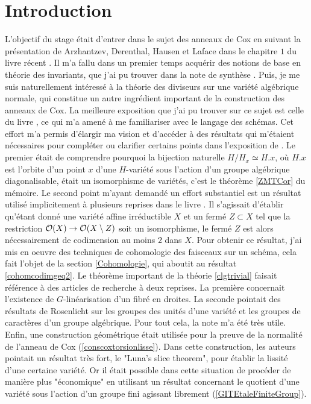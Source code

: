
\section*{Introduction}

L'objectif du stage était d'entrer dans le sujet des anneaux de Cox en suivant la présentation de Arzhantzev, Derenthal, Hausen et Laface dans le chapitre $1$ du livre récent \cite{coxrings}. Il m'a fallu dans un premier temps acquérir des notions de base en théorie des invariants, que j'ai pu trouver dans la note de synthèse \cite{LAGBrion}. Puis, je me suis naturellement intéressé à la théorie des diviseurs sur une variété algébrique normale, qui constitue un autre ingrédient important de la construction des anneaux de Cox. La meilleure exposition que j'ai pu trouver sur ce sujet est celle du livre \cite{Hartshorne}, ce qui m'a amené à me familiariser avec le langage des schémas. Cet effort m'a permis d'élargir ma vision et d'accéder à des résultats qui m'étaient nécessaires pour compléter ou clarifier certains points dans l'exposition de \cite{coxrings}. Le premier était de comprendre pourquoi la bijection naturelle $H/H_x\simeq H.x$, où $H.x$ est l'orbite d'un point $x$ d'une $H$-variété sous l'action d'un groupe algébrique diagonalisable, était un isomorphisme de variétés, c'est le théorème \ref{ZMTCor} du mémoire. Le second point m'ayant demandé un effort substantiel est un résultat utilisé implicitement à plusieurs reprises dans le livre \cite{coxrings}. Il s'agissait d'établir qu'étant donné une variété affine irréductible $X$ et un fermé $Z\subset X$ tel que la restriction $\mathcal{O}(X)\rightarrow \mathcal{O}(X\setminus Z)$ soit un isomorphisme, le fermé $Z$ est alors nécessairement de codimension au moins $2$ dans $X$. Pour obtenir ce résultat, j'ai mis en oeuvre des techniques de cohomologie des faisceaux sur un schéma, cela fait l'objet de la section \ref{Cohomologie}, qui aboutit au résultat \ref{cohomcodimgeq2}. Le théorème important de la théorie \ref{clgtrivial} faisait référence à des articles de recherche à deux reprises. La première concernait l'existence de $G$-linéarisation d'un fibré en droites. La seconde pointait des résultats de Rosenlicht sur les groupes des unités d'une variété et les groupes de caractères d'un groupe algébrique. Pour tout cela, la note \cite{LinearizationGBrion} m'a été très utile. Enfin, une construction géométrique était utilisée pour la preuve de la normalité de l'anneau de Cox (\ref{conscoxtorsionlisse}). Dans cette construction, les auteurs pointait un résultat très fort, le "Luna's slice theorem", pour établir la lissité d'une certaine variété. Or il était possible dans cette situation de procéder de manière plus "économique" en utilisant un résultat concernant le quotient d'une variété sous l'action d'un groupe fini agissant librement (\ref{GITEtaleFiniteGroup}).

